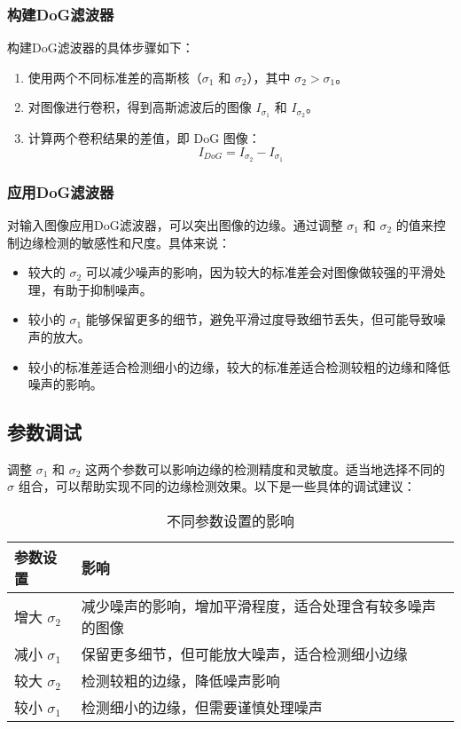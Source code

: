 \documentclass[a4paper,12pt]{article}
\begin{document}
\subsubsection{构建DoG滤波器}

构建DoG滤波器的具体步骤如下：

\begin{enumerate}
    \item 使用两个不同标准差的高斯核（$\sigma_1$ 和 $\sigma_2$），其中 $\sigma_2 > \sigma_1$。
    \item 对图像进行卷积，得到高斯滤波后的图像 $I_{\sigma_1}$ 和 $I_{\sigma_2}$。
    \item 计算两个卷积结果的差值，即 DoG 图像：
    \begin{equation}
    I_{DoG} = I_{\sigma_2} - I_{\sigma_1}
    \end{equation}
\end{enumerate}

\subsubsection{应用DoG滤波器}

对输入图像应用DoG滤波器，可以突出图像的边缘。通过调整 $\sigma_1$ 和 $\sigma_2$ 的值来控制边缘检测的敏感性和尺度。具体来说：

\begin{itemize}
    \item 较大的 $\sigma_2$ 可以减少噪声的影响，因为较大的标准差会对图像做较强的平滑处理，有助于抑制噪声。
    \item 较小的 $\sigma_1$ 能够保留更多的细节，避免平滑过度导致细节丢失，但可能导致噪声的放大。
    \item 较小的标准差适合检测细小的边缘，较大的标准差适合检测较粗的边缘和降低噪声的影响。
\end{itemize}

\subsection{参数调试}

调整 $\sigma_1$ 和 $\sigma_2$ 这两个参数可以影响边缘的检测精度和灵敏度。适当地选择不同的 $\sigma$ 组合，可以帮助实现不同的边缘检测效果。以下是一些具体的调试建议：

\begin{table}[h]
\centering
\begin{tabular}{l|p{6cm}}
\toprule
参数设置 & 影响 \\
\midrule
增大 $\sigma_2$ & 减少噪声的影响，增加平滑程度，适合处理含有较多噪声的图像 \\
减小 $\sigma_1$ & 保留更多细节，但可能放大噪声，适合检测细小边缘 \\
较大 $\sigma_2$ & 检测较粗的边缘，降低噪声影响 \\
较小 $\sigma_1$ & 检测细小的边缘，但需要谨慎处理噪声 \\
\bottomrule
\end{tabular}
\caption{不同参数设置的影响}
\label{tab:param_tuning}
\end{table}
\end{document}

